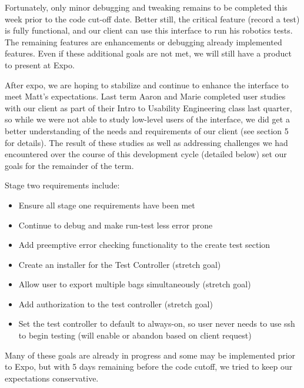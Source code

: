 \documentclass[onecolumn, draftclsnofoot,10pt, compsoc]{IEEEtran}
\begin{document}
Fortunately, only minor debugging and tweaking remains to be completed this week prior to the code cut-off date. Better still, the critical feature (record a test) is fully functional, and our client can use this interface to run his robotics tests. The remaining features are enhancements or debugging already implemented features. Even if these additional goals are not met, we will still have a product to present at Expo.

After expo, we are hoping to stabilize and continue to enhance the interface to meet Matt's expectations. Last term Aaron and Marie completed user studies with our client as part of their Intro to Usability Engineering class last quarter, so while we were not able to study low-level users of the interface, we did get a better understanding of the needs and requirements of our client (see section 5 for details). The result of these studies as well as addressing challenges we had encountered over the course of this development cycle (detailed below) set our goals for the remainder of the term.

Stage two requirements include:
\begin{itemize}
	\item Ensure all stage one requirements have been met
	\item Continue to debug and make run-test less error prone
	\item Add preemptive error checking functionality to the create test section
	\item Create an installer for the Test Controller (stretch goal)
	\item Allow user to export multiple bags simultaneously (stretch goal)
	\item Add authorization to the test controller (stretch goal)
	\item Set the test controller to default to always-on, so user never needs to use ssh to begin testing (will enable or abandon based on client request)
\end{itemize}

Many of these goals are already in progress and some may be implemented prior to Expo, but with 5 days remaining before the code cutoff, we tried to keep our expectations conservative. 
\end{document}
